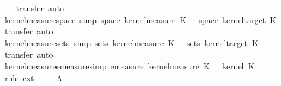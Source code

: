 \begin{isabellebody}
%
\isadelimproof
\ \ %
\endisadelimproof
%
\isatagproof
{}\isamarkupfalse%
\ {\isacharparenleft}{\kern0pt}transfer{\isacharcomma}{\kern0pt}\ auto{\isacharparenright}{\kern0pt}%
\endisatagproof
{\isafoldproof}%
%
\isadelimproof
\isanewline
%
\endisadelimproof
\isanewline
{}\isamarkupfalse%
\ kernel{\isacharunderscore}{\kern0pt}measure{\isacharunderscore}{\kern0pt}space\ {\isacharbrackleft}{\kern0pt}simp{\isacharbrackright}{\kern0pt}{\isacharcolon}{\kern0pt}\ {\isachardoublequoteopen}space\ {\isacharparenleft}{\kern0pt}kernel{\isacharunderscore}{\kern0pt}measure\ K\ {\isasymomega}{\isacharparenright}{\kern0pt}\ {\isacharequal}{\kern0pt}\ space\ {\isacharparenleft}{\kern0pt}kernel{\isacharunderscore}{\kern0pt}target\ K{\isacharparenright}{\kern0pt}{\isachardoublequoteclose}\isanewline
%
\isadelimproof
\ \ %
\endisadelimproof
%
\isatagproof
{}\isamarkupfalse%
\ {\isacharparenleft}{\kern0pt}transfer{\isacharcomma}{\kern0pt}\ auto{\isacharparenright}{\kern0pt}%
\endisatagproof
{\isafoldproof}%
%
\isadelimproof
\isanewline
%
\endisadelimproof
\isanewline
{}\isamarkupfalse%
\ kernel{\isacharunderscore}{\kern0pt}measure{\isacharunderscore}{\kern0pt}sets\ {\isacharbrackleft}{\kern0pt}simp{\isacharbrackright}{\kern0pt}{\isacharcolon}{\kern0pt}\ {\isachardoublequoteopen}sets\ {\isacharparenleft}{\kern0pt}kernel{\isacharunderscore}{\kern0pt}measure\ K\ {\isasymomega}{\isacharparenright}{\kern0pt}\ {\isacharequal}{\kern0pt}\ sets\ {\isacharparenleft}{\kern0pt}kernel{\isacharunderscore}{\kern0pt}target\ K{\isacharparenright}{\kern0pt}{\isachardoublequoteclose}\isanewline
%
\isadelimproof
\ \ %
\endisadelimproof
%
\isatagproof
{}\isamarkupfalse%
\ {\isacharparenleft}{\kern0pt}transfer{\isacharcomma}{\kern0pt}\ auto{\isacharparenright}{\kern0pt}%
\endisatagproof
{\isafoldproof}%
%
\isadelimproof
\isanewline
%
\endisadelimproof
\isanewline
{}\isamarkupfalse%
\ kernel{\isacharunderscore}{\kern0pt}measure{\isacharunderscore}{\kern0pt}emeasure{\isacharbrackleft}{\kern0pt}simp{\isacharbrackright}{\kern0pt}{\isacharcolon}{\kern0pt}\ {\isachardoublequoteopen}emeasure\ {\isacharparenleft}{\kern0pt}kernel{\isacharunderscore}{\kern0pt}measure\ K\ {\isasymomega}{\isacharparenright}{\kern0pt}\ {\isacharequal}{\kern0pt}\ kernel\ K\ {\isasymomega}{\isachardoublequoteclose}\isanewline
%
\isadelimproof
\ \ %
\endisadelimproof
%
\isatagproof
{}\isamarkupfalse%
\ {\isacharparenleft}{\kern0pt}rule\ ext{\isacharparenright}{\kern0pt}\isanewline
\ \ \isamarkupfalse%
\ \ A{\isacharprime}{\kern0pt}\isanewline

\end{isabellebody}

